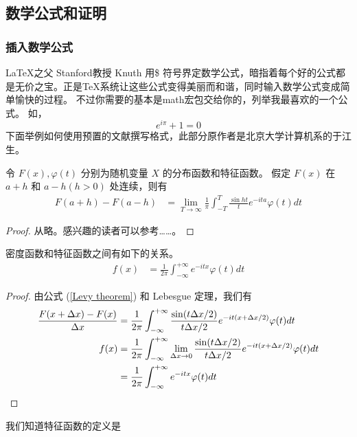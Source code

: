 \subsection{数学公式和证明}
\subsubsection{ 插入数学公式}
\LaTeX 之父 Stanford教授 Knuth 用\$ 符号界定数学公式，暗指着每个好的公式都是无价之宝。正是\TeX 系统让这些公式变得美丽而和谐，同时输入数学公式变成简单愉快的过程。
不过你需要的基本是\AmS math宏包交给你的，列举我最喜欢的一个公式。
如，
\[  e^{i\pi}+1=0\]
下面举例如何使用预置的文献撰写格式，此部分原作者是北京大学计算机系的于江生。
\begin{theorem}[L\'{e}vy\index{L\'{e}vy 定理}]
令 $F(x),\varphi(t)$ 分别为随机变量 $X$ 的分布函数和特征函数。
假定 $F(x)$ 在 $a+h$ 和 $a-h (h>0)$ 处连续，则有
\begin{align}
 \label{Levy theorem}  %
F(a+h)-F(a-h)&=\lim_{T\rightarrow\infty}\frac{1}{\pi}\int^{T}_{-T}\frac{\sin ht}{t} 
e^{-ita}\varphi(t)dt
\end{align}
\end{theorem}
\begin{proof}
  从略。感兴趣的读者可以参考……。
\end{proof}


\begin{corollary}
密度函数和特征函数之间有如下的关系。
\begin{align}
 \label{DensityCharacteristic}   %
  f(x)&=\frac{1}{2\pi}\int^{+\infty}_{-\infty} e^{-itx}\varphi(t)dt
\end{align}
\end{corollary}

\begin{proof}
由公式 (\ref{Levy theorem}) 和 Lebesgue 定理，我们有
\begin{align*}
 \frac{F(x+\Delta x)-F(x)}{\Delta x}&=\frac{1}{2\pi}\int^{+\infty}_{-\infty}
 \frac{\sin(t\Delta x/2)}{t\Delta x/2} e^{-it(x+\Delta x/2)}\varphi(t) dt\\
  f(x)&=\frac{1}{2\pi}\int^{+\infty}_{-\infty}\lim_{\Delta x\rightarrow 0}
 \frac{\sin(t\Delta x/2)}{t\Delta x/2} e^{-it(x+\Delta x/2)}\varphi(t) dt\\
  &=\frac{1}{2\pi}\int^{+\infty}_{-\infty} e^{-itx}\varphi(t)dt\qedhere
\end{align*}
\end{proof}

我们知道特征函数的定义是

